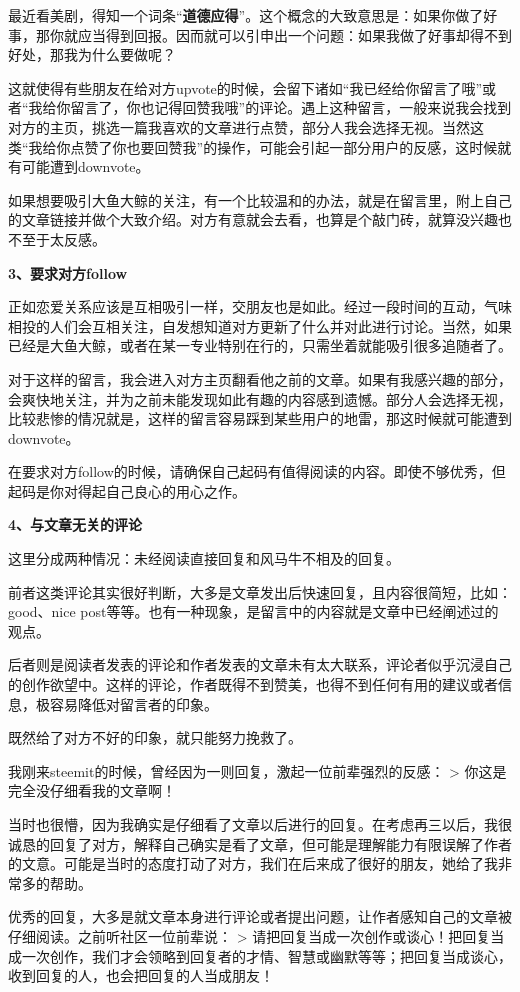 \documentclass[]{ctexbook}
\begin{document}
最近看美剧，得知一个词条``\textbf{道德应得}''。这个概念的大致意思是：如果你做了好事，那你就应当得到回报。因而就可以引申出一个问题：如果我做了好事却得不到好处，那我为什么要做呢？

这就使得有些朋友在给对方upvote的时候，会留下诸如``我已经给你留言了哦''或者``我给你留言了，你也记得回赞我哦''的评论。遇上这种留言，一般来说我会找到对方的主页，挑选一篇我喜欢的文章进行点赞，部分人我会选择无视。当然这类``我给你点赞了你也要回赞我''的操作，可能会引起一部分用户的反感，这时候就有可能遭到downvote。

如果想要吸引大鱼大鲸的关注，有一个比较温和的办法，就是在留言里，附上自己的文章链接并做个大致介绍。对方有意就会去看，也算是个敲门砖，就算没兴趣也不至于太反感。

\textbf{3、要求对方follow}

正如恋爱关系应该是互相吸引一样，交朋友也是如此。经过一段时间的互动，气味相投的人们会互相关注，自发想知道对方更新了什么并对此进行讨论。当然，如果已经是大鱼大鲸，或者在某一专业特别在行的，只需坐着就能吸引很多追随者了。

对于这样的留言，我会进入对方主页翻看他之前的文章。如果有我感兴趣的部分，会爽快地关注，并为之前未能发现如此有趣的内容感到遗憾。部分人会选择无视，比较悲惨的情况就是，这样的留言容易踩到某些用户的地雷，那这时候就可能遭到downvote。

在要求对方follow的时候，请确保自己起码有值得阅读的内容。即使不够优秀，但起码是你对得起自己良心的用心之作。

\textbf{4、与文章无关的评论}

这里分成两种情况：未经阅读直接回复和风马牛不相及的回复。

前者这类评论其实很好判断，大多是文章发出后快速回复，且内容很简短，比如：good、nice post等等。也有一种现象，是留言中的内容就是文章中已经阐述过的观点。

后者则是阅读者发表的评论和作者发表的文章未有太大联系，评论者似乎沉浸自己的创作欲望中。这样的评论，作者既得不到赞美，也得不到任何有用的建议或者信息，极容易降低对留言者的印象。

既然给了对方不好的印象，就只能努力挽救了。

我刚来steemit的时候，曾经因为一则回复，激起一位前辈强烈的反感：
\textgreater{} 你这是完全没仔细看我的文章啊！

当时也很懵，因为我确实是仔细看了文章以后进行的回复。在考虑再三以后，我很诚恳的回复了对方，解释自己确实是看了文章，但可能是理解能力有限误解了作者的文意。可能是当时的态度打动了对方，我们在后来成了很好的朋友，她给了我非常多的帮助。

优秀的回复，大多是就文章本身进行评论或者提出问题，让作者感知自己的文章被仔细阅读。之前听社区一位前辈说：
\textgreater{} 请把回复当成一次创作或谈心！把回复当成一次创作，我们才会领略到回复者的才情、智慧或幽默等等；把回复当成谈心，收到回复的人，也会把回复的人当成朋友！
\end{document}
